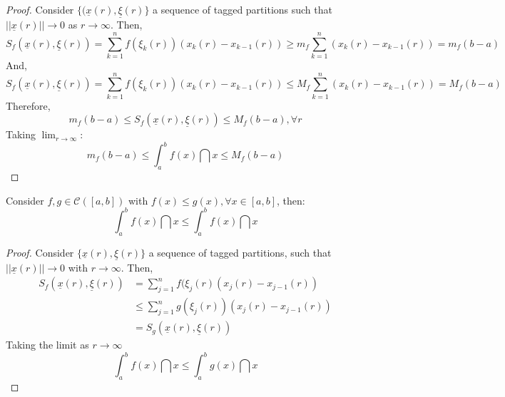 \begin{proof}
    Consider $\{ (\underline{x}(r), \underline{\xi}(r)\}$ a sequence of tagged partitions such that $|| \underline{x}(r) || \to 0$ as $r \to \infty$. Then,
    \begin{equation*}
        S_f(\underline{x}(r), \underline{\xi}(r)) = \sum \limits_{k=1}^n f(\xi_k(r))(x_k(r) - x_{k-1}(r)) \geq m_f \sum \limits_{k=1}^n (x_k(r) - x_{k-1}(r)) = m_f(b-a)
    \end{equation*}
    And,
    \begin{equation*}
        S_f(\underline{x}(r), \underline{\xi}(r)) = \sum \limits_{k=1}^n f(\xi_k(r))(x_k(r) - x_{k-1}(r)) \leq M_f \sum \limits_{k=1}^n (x_k(r) - x_{k-1}(r)) = M_f(b-a)
    \end{equation*}
    Therefore,
    \begin{equation*}
        m_f(b-a) \leq S_f(\underline{x}(r), \underline{\xi}(r)) \leq M_f(b-a), \forall r
    \end{equation*}
    Taking $\lim_{r \to \infty}$:
    \begin{equation*}
        m_f(b-a) \leq \int_a^b f(x) \dint x \leq M_f(b-a)
    \end{equation*}
\end{proof}

\begin{theorem}
    Consider $f, g \in \mathcal{C}([a,b])$ with $f(x) \leq g(x), \forall x \in [a,b]$, then:
    \begin{equation*}
        \int_a^b f(x) \dint x \leq \int_a^b f(x) \dint x
    \end{equation*}
\end{theorem}

\begin{proof}
    Consider $\{\underline{x}(r), \underline{\xi}(r)\}$ a sequence of tagged partitions, such that $||\underline{x}(r)|| \to 0$ with $r \to \infty$. Then,
    \begin{align*}
        S_f(\underline{x}(r), \underline{\xi}(r)) &= \sum \limits_{j=1}^n f(\xi_j(r)(x_j(r) - x_{j-1}(r)) \\
        &\leq \sum \limits_{j=1}^n g(\xi_j(r))(x_j(r) - x_{j-1}(r)) \\
        &=S_g(\underline{x}(r), \underline{\xi}(r))
    \end{align*}
    Taking the limit as $r \to \infty$
    \begin{equation*}
        \int_a^b f(x) \dint x \leq \int_a^b g(x) \dint x
    \end{equation*}
\end{proof}

